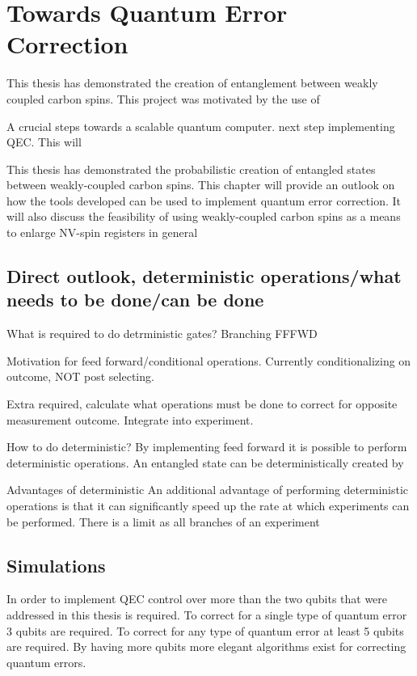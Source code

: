 \chapter{Towards Quantum Error Correction}
This thesis has demonstrated the creation of entanglement between weakly coupled carbon spins.
This project was motivated by the use of



A crucial steps towards a scalable quantum computer.
next step implementing QEC.
This will

This thesis has demonstrated the probabilistic creation of entangled states between weakly-coupled carbon spins.
This chapter will provide an outlook on how the tools developed can be used to implement quantum error correction.
It will also discuss the feasibility of using weakly-coupled carbon spins as a means to enlarge NV-spin registers in general

\section{Direct outlook, deterministic operations/what needs to be done/can be done}
What is required to do detrministic gates?
Branching
FFFWD

Motivation for feed forward/conditional operations.
Currently conditionalizing on outcome, NOT post selecting.

Extra required, calculate what operations must be done to correct for opposite measurement outcome.
Integrate into experiment.


How to do deterministic?
By implementing feed forward it is possible to perform deterministic operations.
An entangled state can be deterministically created by


Advantages of deterministic
An additional advantage of performing deterministic operations is that it can significantly speed up the rate at which experiments can be performed.
There is a limit as all branches of an experiment


\section{Simulations}
In order to implement QEC control over more than the two qubits that were addressed in this thesis is required.
To correct for a single type of quantum error 3 qubits are required.
To correct for any type of quantum error at least 5 qubits are required.
By having more qubits more elegant algorithms exist for correcting quantum errors.


